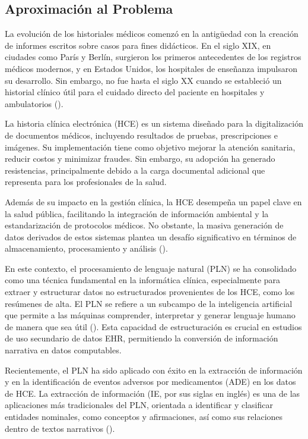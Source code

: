 \documentclass[../main.tex]{subfiles}
\begin{document}
\subsection{Aproximación al Problema}
La evolución de los historiales médicos comenzó en la antigüedad con la creación de informes escritos sobre casos para fines didácticos. En el siglo XIX, en ciudades como París y Berlín, surgieron los primeros antecedentes de los registros médicos modernos, y en Estados Unidos, los hospitales de enseñanza impulsaron su desarrollo. Sin embargo, no fue hasta el siglo XX cuando se estableció un historial clínico útil para el cuidado directo del paciente en hospitales y ambulatorios (\cite{gillum2013papyrus}). 

La historia clínica electrónica (HCE) es un sistema diseñado para la digitalización de documentos médicos, incluyendo resultados de pruebas, prescripciones e imágenes. Su implementación tiene como objetivo mejorar la atención sanitaria, reducir costos y minimizar fraudes. Sin embargo, su adopción ha generado resistencias, principalmente debido a la carga documental adicional que representa para los profesionales de la salud.

Además de su impacto en la gestión clínica, la HCE desempeña un papel clave en la salud pública, facilitando la integración de información ambiental y la estandarización de protocolos médicos. No obstante, la masiva generación de datos derivados de estos sistemas plantea un desafío significativo en términos de almacenamiento, procesamiento y análisis (\cite{cyganek2016survey}). 

En este contexto, el procesamiento de lenguaje natural (PLN) se ha consolidado como una técnica fundamental en la informática clínica, especialmente para extraer y estructurar datos no estructurados provenientes de los HCE, como los resúmenes de alta. El PLN se refiere a un subcampo de la inteligencia artificial que permite a las máquinas comprender, interpretar y generar lenguaje humano de manera que sea útil (\cite{chopra2013natural}). Esta capacidad de estructuración es crucial en estudios de uso secundario de datos EHR, permitiendo la conversión de información narrativa en datos computables. 

Recientemente, el PLN ha sido aplicado con éxito en la extracción de información y en la identificación de eventos adversos por medicamentos (ADE) en los datos de HCE. La extracción de información (IE, por sus siglas en inglés) es una de las aplicaciones más tradicionales del PLN, orientada a identificar y clasificar entidades nominales, como conceptos y afirmaciones, así como sus relaciones dentro de textos narrativos (\cite{frey2014ehr}). 
\end{document}
